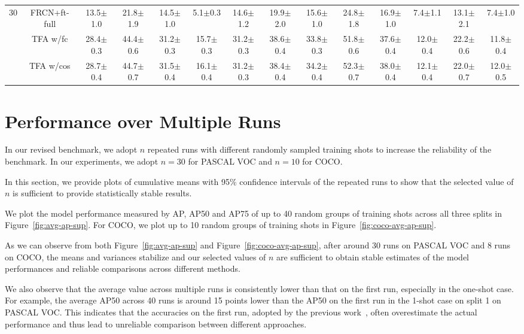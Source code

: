 \documentclass{article}
\newcommand{\model}{TFA\xspace}
\begin{document}
\begin{table*}[ht]
{\begin{tabular}{c|c|cccccc|ccc|ccc}
\multirow{3}{*}{30} & FRCN+ft-full & 13.5$\pm$1.0 & 21.8$\pm$1.9 & 14.5$\pm$1.0 & 5.1$\pm$0.3 & 14.6$\pm$1.2 & 19.9$\pm$2.0 & 15.6$\pm$1.0 & 24.8$\pm$1.8 & 16.9$\pm$1.0 & 7.4$\pm$1.1 & 13.1$\pm$2.1 & 7.4$\pm$1.0 \\
 & {\model w/fc} & 28.4$\pm$0.3 & 44.4$\pm$0.6 & 31.2$\pm$0.3 & 15.7$\pm$0.3 & 31.2$\pm$0.3 & 38.6$\pm$0.4 & 33.8$\pm$0.3 & 51.8$\pm$0.6 & 37.6$\pm$0.4 & 12.0$\pm$0.4 & 22.2$\pm$0.6 & 11.8$\pm$0.4 \\
 & {\cellcolor{Gray} \model w/cos} & \cellcolor{Gray}28.7$\pm$0.4 & \cellcolor{Gray}44.7$\pm$0.7 & \cellcolor{Gray}31.5$\pm$0.4 & \cellcolor{Gray}16.1$\pm$0.4 & \cellcolor{Gray}31.2$\pm$0.3 & \cellcolor{Gray}38.4$\pm$0.4 & \cellcolor{Gray}34.2$\pm$0.4 & \cellcolor{Gray}52.3$\pm$0.7 & \cellcolor{Gray}38.0$\pm$0.4 & \cellcolor{Gray}12.1$\pm$0.4 & \cellcolor{Gray}22.0$\pm$0.7 & \cellcolor{Gray}12.0$\pm$0.5 \\
\bottomrule
\end{tabular}}
\vspace{-1mm}
\label{tab:coco_bench}
\end{table*}

\section{Performance over Multiple Runs}
In our revised benchmark, we adopt $n$ repeated runs with different randomly sampled training shots to increase the reliability of the benchmark. In our experiments, we adopt $n=30$ for PASCAL VOC and $n=10$ for COCO. 

In this section, we provide plots of cumulative means with 95\% confidence intervals of the repeated runs to show
that the selected value of $n$ is sufficient to provide statistically stable results. 

We plot the model performance measured by AP, AP50 and AP75 of up to 40 random groups of training shots across all three splits in Figure~\ref{fig:avg-ap-sup}. For COCO, we plot  up  to  10  random  groups of training shots in Figure~\ref{fig:coco-avg-ap-sup}.

As we can observe from both Figure~\ref{fig:avg-ap-sup} and Figure~\ref{fig:coco-avg-ap-sup}, after around 30 runs on PASCAL VOC and 8 runs on COCO, the means and variances stabilize and our selected values of $n$ are sufficient to obtain stable estimates of the model performances and reliable comparisons across different methods. 

We also observe that the average value across multiple runs is consistently lower than that on the first run, especially in the one-shot case. For example, the average AP50 across 40 runs is around 15 points lower than the AP50 on the first run in the 1-shot case on split 1 on PASCAL VOC. This indicates that the accuracies on the first run, adopted by the previous work~\cite{kang2019few, yan2019meta, wang2019meta}, often overestimate the actual performance and thus lead to unreliable comparison between different approaches. 
\end{document}
